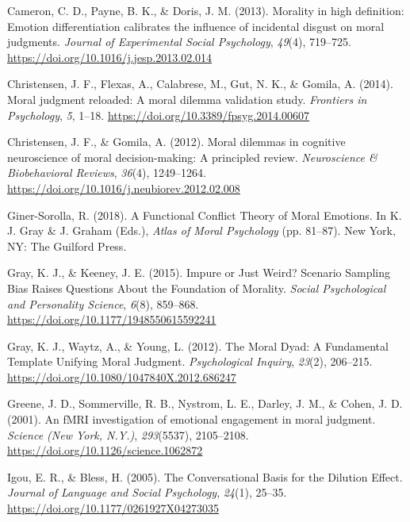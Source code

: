 \documentclass[
  man,floatsintext]{apa7}
\newlength{\cslhangindent}
\newenvironment{CSLReferences}[2] %
 {\begin{list}{}{%
  \setlength{\itemindent}{0pt}
  \setlength{\leftmargin}{0pt}
  \setlength{\parsep}{0pt}
  \ifodd #1
   \setlength{\leftmargin}{\cslhangindent}
   \setlength{\itemindent}{-1\cslhangindent}
  \fi
  \setlength{\itemsep}{#2\baselineskip}}}
 {\end{list}}
\begin{document}
\label{refs}
\begin{CSLReferences}{1}{0}
Cameron, C. D., Payne, B. K., \& Doris, J. M. (2013). Morality in high definition: {Emotion} differentiation calibrates the influence of incidental disgust on moral judgments. \emph{Journal of Experimental Social Psychology}, \emph{49}(4), 719--725. \url{https://doi.org/10.1016/j.jesp.2013.02.014}

Christensen, J. F., Flexas, A., Calabrese, M., Gut, N. K., \& Gomila, A. (2014). Moral judgment reloaded: A moral dilemma validation study. \emph{Frontiers in Psychology}, \emph{5}, 1--18. \url{https://doi.org/10.3389/fpsyg.2014.00607}

Christensen, J. F., \& Gomila, A. (2012). Moral dilemmas in cognitive neuroscience of moral decision-making: {A} principled review. \emph{Neuroscience \& Biobehavioral Reviews}, \emph{36}(4), 1249--1264. \url{https://doi.org/10.1016/j.neubiorev.2012.02.008}

Giner-Sorolla, R. (2018). A {Functional Conflict Theory} of {Moral Emotions}. In K. J. Gray \& J. Graham (Eds.), \emph{Atlas of {Moral Psychology}} (pp. 81--87). {New York, NY}: {The Guilford Press}.

Gray, K. J., \& Keeney, J. E. (2015). Impure or {Just Weird}? {Scenario Sampling Bias Raises Questions About} the {Foundation} of {Morality}. \emph{Social Psychological and Personality Science}, \emph{6}(8), 859--868. \url{https://doi.org/10.1177/1948550615592241}

Gray, K. J., Waytz, A., \& Young, L. (2012). The {Moral Dyad}: {A Fundamental Template Unifying Moral Judgment}. \emph{Psychological Inquiry}, \emph{23}(2), 206--215. \url{https://doi.org/10.1080/1047840X.2012.686247}

Greene, J. D., Sommerville, R. B., Nystrom, L. E., Darley, J. M., \& Cohen, J. D. (2001). An {fMRI} investigation of emotional engagement in moral judgment. \emph{Science (New York, N.Y.)}, \emph{293}(5537), 2105--2108. \url{https://doi.org/10.1126/science.1062872}

Igou, E. R., \& Bless, H. (2005). The {Conversational Basis} for the {Dilution Effect}. \emph{Journal of Language and Social Psychology}, \emph{24}(1), 25--35. \url{https://doi.org/10.1177/0261927X04273035}


\end{CSLReferences}
\end{document}
